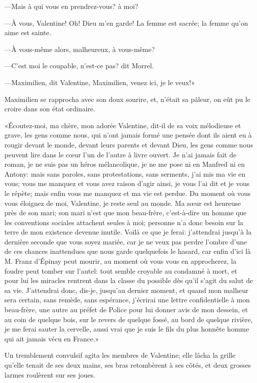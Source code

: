 —Mais à qui vous en prendrez-vous? à moi? 

—À vous, Valentine! Oh! Dieu m'en garde! La femme est sacrée; la femme qu'on aime est sainte. 

—À vous-même alors, malheureux, à vous-même? 

—C'est moi le coupable, n'est-ce pas? dit Morrel. 

—Maximilien, dit Valentine, Maximilien, venez ici, je le veux!» 

Maximilien se rapprocha avec son doux sourire, et, n'était sa pâleur, on eût pu le croire dans son état ordinaire. 

«Écoutez-moi, ma chère, mon adorée Valentine, dit-il de sa voix mélodieuse et grave, les gens comme nous, qui n'ont jamais formé une pensée dont ils aient eu à rougir devant le monde, devant leurs parents et devant Dieu, les gens comme nous peuvent lire dans le cœur l'un de l'autre à livre ouvert. Je n'ai jamais fait de roman, je ne suis pas un héros mélancolique, je ne me pose ni en Manfred ni en Antony: mais sans paroles, sans protestations, sans serments, j'ai mis ma vie en vous; vous me manquez et vous avez raison d'agir ainsi, je vous l'ai dit et je vous le répète; mais enfin vous me manquez et ma vie est perdue. Du moment où vous vous éloignez de moi, Valentine, je reste seul au monde. Ma sœur est heureuse près de son mari; son mari n'est que mon beau-frère, c'est-à-dire un homme que les conventions sociales attachent seules à moi; personne n'a donc besoin sur la terre de mon existence devenue inutile. Voilà ce que je ferai: j'attendrai jusqu'à la dernière seconde que vous soyez mariée, car je ne veux pas perdre l'ombre d'une de ces chances inattendues que nous garde quelquefois le hasard, car enfin d'ici là M. Franz d'Épinay peut mourir, au moment où vous vous en approcherez, la foudre peut tomber sur l'autel: tout semble croyable au condamné à mort, et pour lui les miracles rentrent dans la classe du possible dès qu'il s'agit du salut de sa vie. J'attendrai donc, dis-je, jusqu'au dernier moment, et quand mon malheur sera certain, sans remède, sans espérance, j'écrirai une lettre confidentielle à mon beau-frère, une autre au préfet de Police pour lui donner avis de mon dessein, et au coin de quelque bois, sur le revers de quelque fossé, au bord de quelque rivière, je me ferai sauter la cervelle, aussi vrai que je suis le fils du plus honnête homme qui ait jamais vécu en France.» 

Un tremblement convulsif agita les membres de Valentine; elle lâcha la grille qu'elle tenait de ses deux mains, ses bras retombèrent à ses côtés, et deux grosses larmes roulèrent sur ses joues. 

